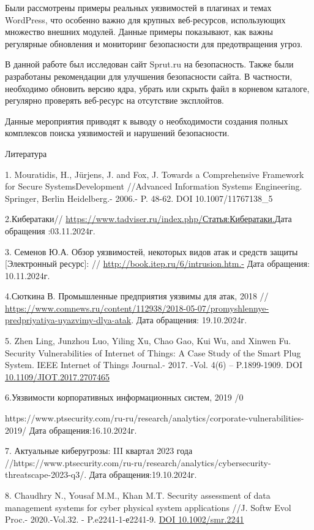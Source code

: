 \documentclass[
]{article}
\begin{document}
Были рассмотрены примеры реальных уязвимостей в плагинах и темах
WordPress, что особенно важно для крупных веб-ресурсов, использующих
множество внешних модулей. Данные примеры показывают, как важны
регулярные обновления и мониторинг безопасности для предотвращения
угроз.

В данной работе был исследован сайт Sprut.ru на безопасность. Также были
разработаны рекомендации для улучшения безопасности сайта. В частности,
необходимо обновить версию ядра, убрать или скрыть файл в корневом
каталоге, регулярно проверять веб-ресурс на отсутствие эксплойтов.

Данные мероприятия приводят к выводу о необходимости создания полных
комплексов поиска уязвимостей и нарушений безопасности.

Литература

1. Mouratidis, H., Jürjens, J. and Fox, J. Towards a Comprehensive
Framework for Secure SystemsDevelopment //Advanced Information Systems
Engineering. Springer, Berlin Heidelberg.- 2006.- P. 48-62. DOI
10.1007/11767138\_5

2.Кибератаки//
\href{\%20https://www.tadviser.ru/index.php/Статья:Кибератаки.}{https://www.tadviser.ru/index.php/Статья:Кибератаки.}Дата
обращения :03.11.2024г.

3. Семенов Ю.А. Обзор уязвимостей, некоторых видов атак и средств защиты
{[}Электронный ресурс{]}: // \url{http://book.itep.ru/6/intrusion.htm.-}
Дата обращения: 10.11.2024г.

4.Сюткина В. Промышленные предприятия уязвимы для атак, 2018 //
\url{https://www.comnews.ru/content/112938/2018-05-07/promyshlennye-predpriyatiya-uyazvimy-dlya-atak}.
Дата обращения: 19.10.2024г.

5. Zhen Ling, Junzhou Luo, Yiling Xu, Chao Gao, Kui Wu, and Xinwen Fu.
Security Vulnerabilities of Internet of Things: A Case Study of the
Smart Plug System. IEEE Internet of Things Journal.- 2017. -Vol. 4(6) --
P.1899-1909. DOI
\href{https://doi.org/10.1109/JIOT.2017.2707465}{10.1109/JIOT.2017.2707465}

6.Уязвимости корпоративных информационных систем, 2019 /0

https://www.ptsecurity.com/ru-ru/research/analytics/corporate-vulnerabilities-2019/
Дата обращения:16.10.2024г.

7. Актуальные киберугрозы: III квартал 2023 года
//https://www.ptsecurity.com/ru-ru/research/analytics/cybersecurity-threatscape-2023-q3/.
Дата обращения:19.10.2024г.

8. Chaudhry N., Yousaf M.M., Khan M.T. Security assessment of data
management systems for cyber physical system applications //J. Softw
Evol Proc.- 2020.-Vol.32. - P.e2241-1-е2241-9.
\href{https://doi.org/10.1002/smr.2241}{DOI 10.1002/smr.2241}
\end{document}
